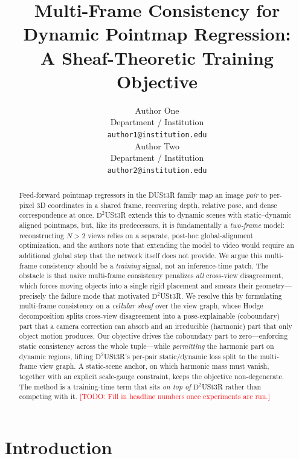 \documentclass{article}
\title{Multi-Frame Consistency for Dynamic Pointmap Regression:\\
A Sheaf-Theoretic Training Objective}
\author{%
  Author One \\
  Department / Institution \\
  \texttt{author1@institution.edu} \\
  \And
  Author Two \\
  Department / Institution \\
  \texttt{author2@institution.edu} \\
}
\newcommand{\todo}[1]{\textcolor{red}{[TODO: #1]}}
\theoremstyle{definition}
\theoremstyle{plain}
\theoremstyle{remark}
\begin{document}
\maketitle

\begin{abstract}
Feed-forward pointmap regressors in the DUSt3R family map an image
\emph{pair} to per-pixel 3D coordinates in a shared frame, recovering
depth, relative pose, and dense correspondence at once.
$\mathrm{D}^2$USt3R extends this to dynamic scenes with static--dynamic
aligned pointmaps, but, like its predecessors, it is fundamentally a
\emph{two-frame} model: reconstructing $N>2$ views relies on a separate,
post-hoc global-alignment optimization, and the authors note that
extending the model to video would require an additional global step
that the network itself does not provide. We argue this multi-frame
consistency should be a \emph{training} signal, not an inference-time
patch. The obstacle is that naive multi-frame consistency penalizes
\emph{all} cross-view disagreement, which forces moving objects into a
single rigid placement and smears their geometry---precisely the failure
mode that motivated $\mathrm{D}^2$USt3R. We resolve this by formulating
multi-frame consistency on a \emph{cellular sheaf} over the view graph,
whose Hodge decomposition splits cross-view disagreement into a
pose-explainable (coboundary) part that a camera correction can absorb
and an irreducible (harmonic) part that only object motion produces. Our
objective drives the coboundary part to zero---enforcing static
consistency across the whole tuple---while \emph{permitting} the harmonic
part on dynamic regions, lifting $\mathrm{D}^2$USt3R's per-pair
static/dynamic loss split to the multi-frame view graph. A static-scene
anchor, on which harmonic mass must vanish, together with an explicit
scale-gauge constraint, keeps the objective non-degenerate. The method is
a training-time term that sits \emph{on top of} $\mathrm{D}^2$USt3R rather
than competing with it.
\todo{Fill in headline numbers once experiments are run.}
\end{abstract}

\section{Introduction}
\end{document}
